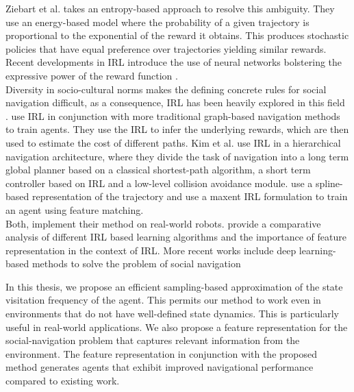 Ziebart et al. \cite{ziebart_maxent_2008} takes an entropy-based approach to resolve this ambiguity. They use an energy-based model where the probability of a given trajectory is proportional to the exponential of the reward it obtains.
This produces stochastic policies that have equal preference over trajectories yielding similar rewards. Recent developments in IRL introduce the use of neural networks bolstering the expressive power of the reward function \cite{wulfmeier2015maximum}. \\

Diversity in socio-cultural norms makes the defining concrete rules for social navigation difficult, as a consequence, IRL has been heavily explored in this field \cite{kuderer_socially_nodate, kretzschmar_socially_2016}. \cite{shiarlis_rapidly_2017, okal_efcient_nodate} use IRL in conjunction with more traditional graph-based navigation methods to train agents. They use the IRL to infer the underlying rewards, which are then used to estimate the cost of different paths. Kim et al. \cite{kim_socially_2016} use IRL in a hierarchical navigation architecture, where they divide the task of navigation into a long term global planner based on a classical shortest-path algorithm, a short term controller based on IRL and a low-level collision avoidance module. \cite{kretzschmar_socially_2016} use a spline-based representation of the trajectory and use a maxent IRL formulation to train an agent using feature matching. 
\\
Both, \cite{kim_socially_2016, kretzschmar_socially_2016} implement their method on real-world robots. \cite{vasquez_inverse_2014} provide a comparative analysis of different IRL based learning algorithms and the importance of feature representation in the context of IRL. More recent works include deep learning-based methods to solve the problem of social navigation \cite{fahad_learning_2018, wulfmeier2015maximum}


In this thesis, we propose an efficient sampling-based approximation of the state visitation frequency of the agent. This permits our method to work even in environments that do not have well-defined state dynamics. This is particularly useful in real-world applications. We also propose a feature representation for the social-navigation problem that captures relevant information from the environment. The feature representation in conjunction with the proposed method generates agents that exhibit improved navigational performance compared to existing work.

